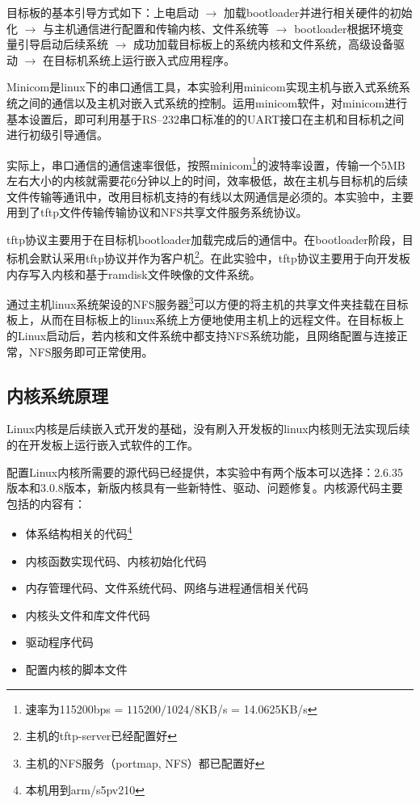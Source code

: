 \documentclass[hyperref,UTF8]{ctexart}
\begin{document}
目标板的基本引导方式如下：上电启动 $\rightarrow$ 加载bootloader并进行相关硬件的初始化 $\rightarrow$ 与主机通信进行配置和传输内核、文件系统等 $\rightarrow$ bootloader根据环境变量引导启动后续系统 $\rightarrow$ 成功加载目标板上的系统内核和文件系统，高级设备驱动 $\rightarrow$ 在目标机系统上运行嵌入式应用程序。

Minicom是linux下的串口通信工具，本实验利用minicom实现主机与嵌入式系统系统之间的通信以及主机对嵌入式系统的控制。运用minicom软件，对minicom进行基本设置后，即可利用基于RS--232串口标准的的UART接口在主机和目标机之间进行初级引导通信。

实际上，串口通信的通信速率很低，按照minicom\footnote{速率为115200bps = $115200/1024/8$KB/s = 14.0625KB/s}的波特率设置，传输一个5MB左右大小的内核就需要花6分钟以上的时间，效率极低，故在主机与目标机的后续文件传输等通讯中，改用目标机支持的有线以太网通信是必须的。本实验中，主要用到了tftp文件传输传输协议和NFS共享文件服务系统协议。

tftp协议主要用于在目标机bootloader加载完成后的通信中。在bootloader阶段，目标机会默认采用tftp协议并作为客户机\footnote{主机的tftp-server已经配置好}。在此实验中，tftp协议主要用于向开发板内存写入内核和基于ramdisk文件映像的文件系统。

通过主机linux系统架设的NFS服务器\footnote{主机的NFS服务（portmap, NFS）都已配置好}可以方便的将主机的共享文件夹挂载在目标板上，从而在目标板上的linux系统上方便地使用主机上的远程文件。在目标板上的Linux启动后，若内核和文件系统中都支持NFS系统功能，且网络配置与连接正常，NFS服务即可正常使用。

\subsection{内核系统原理}\label{subsec:kern-prin}
Linux内核是后续嵌入式开发的基础，没有刷入开发板的linux内核则无法实现后续的在开发板上运行嵌入式软件的工作。

配置Linux内核所需要的源代码已经提供，本实验中有两个版本可以选择：2.6.35版本和3.0.8版本，新版内核具有一些新特性、驱动、问题修复。内核源代码主要包括的内容有：
\begin{itemize}
    \item 体系结构相关的代码\footnote{本机用到arm/s5pv210}
    \item 内核函数实现代码、内核初始化代码
    \item 内存管理代码、文件系统代码、网络与进程通信相关代码
    \item 内核头文件和库文件代码
    \item 驱动程序代码
    \item 配置内核的脚本文件
\end{itemize}
\end{document}
